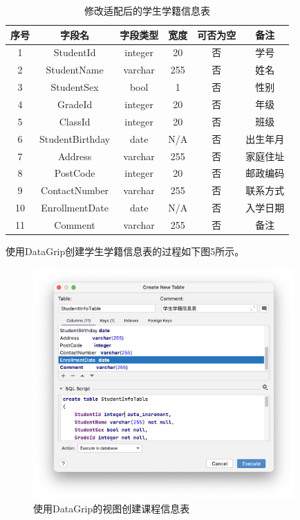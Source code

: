 \documentclass[a4paper,UTF8,heading=false,12pt]{article}
\begin{document}
    \begin{table}[htbp]
        \begin{center}
            \begin{tabular}{@{}cccccc@{}}
                \toprule
                序号 & 字段名         & 字段类型    & 宽度  & 可否为空 & 备注   \\ \midrule
                1  & StudentId   & integer & 20  & 否    & 学号   \\
                2  & StudentName & varchar & 255 & 否    & 姓名   \\
                3  & StudentSex  & bool & 1  & 否    & 性别   \\ 
                4  & GradeId     & integer & 20  & 否    & 年级   \\ 
                5  & ClassId     & integer & 20  & 否    & 班级   \\ 
                6  & StudentBirthday     & date & N/A  & 否    & 出生年月   \\ 
                7  & Address     & varchar & 255  & 否    & 家庭住址   \\ 
                8  & PostCode     & integer & 20  & 否    & 邮政编码   \\ 
                9  & ContactNumber     & varchar & 255  & 否    & 联系方式   \\ 
                10  & EnrollmentDate    & date & N/A  & 否    & 入学日期   \\ 
                11  & Comment    & varchar & 255  & 否    & 备注   \\ 
                \bottomrule
                \end{tabular}
                \caption{修改适配后的学生学籍信息表}
        \end{center}
    \end{table}

    使用DataGrip创建学生学籍信息表的过程如下图5所示。

    \begin{figure}[htbp]
        \centering
        \includegraphics[width=10cm]{../Images/StudentInfoTable.png}
        \caption{使用DataGrip的视图创建课程信息表}
    \end{figure}
\end{document}
